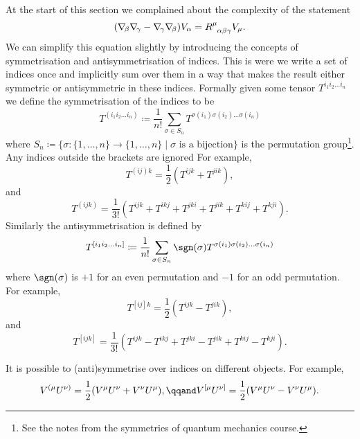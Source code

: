 At the start of this section we complained about the complexity of the statement
\begin{equation}
    (\covariantDerivative{\beta}\covariantDerivative{\gamma} - \covariantDerivative{\gamma}\covariantDerivative{\beta})V_\alpha = \tensor{R}{^\mu_{\alpha\beta\gamma}}V_\mu.
\end{equation}
We can simplify this equation slightly by introducing the concepts of symmetrisation and antisymmetrisation of indices.
This is were we write a set of indices once and implicitly sum over them in a way that makes the result either symmetric or antisymmetric in these indices.
Formally given some tensor \(T^{i_1i_2\dotso i_n}\) we define the symmetrisation of the indices to be
\begin{equation}
    T^{(i_1i_2\dotso i_n)} \coloneqq \frac{1}{n!}\sum_{\sigma \in S_n} T^{\sigma(i_1)\sigma(i_2) \dotso \sigma(i_n)}
\end{equation}
where \(S_n \coloneqq \{\sigma \colon \{1, \dotsc, n\} \to \{1, \dotsc, n\} \mid \sigma \text{ is a bijection}\}\) is the permutation group\footnote{See the notes from the symmetries of quantum mechanics course.}.
Any indices outside the brackets are ignored
For example,
\begin{equation}
    T^{(ij)k} = \frac{1}{2}(T^{ijk} + T^{jik}),
\end{equation}
and
\begin{equation}
    T^{(ijk)} = \frac{1}{3!} (T^{ijk} + T^{ikj} + T^{jki} + T^{jik} + T^{kij} + T^{kji}).
\end{equation}
Similarly the antisymmetrisation is defined by
\begin{equation}
    T^{[i_1i_2\dotso i_n]} \coloneqq \frac{1}{n!}\sum_{\sigma \in S_n} \sgn(\sigma) T^{\sigma(i_1)\sigma(i_2)\dotso \sigma(i_n)}
\end{equation}
where \(\sgn(\sigma)\) is \(+1\) for an even permutation and \(-1\) for an odd permutation.
For example,
\begin{equation}
    T^{[ij]k} = \frac{1}{2}(T^{ijk} - T^{jik}),
\end{equation}
and
\begin{equation}
    T^{[ijk]} = \frac{1}{3!}(T^{ijk} - T^{ikj} + T^{jki} - T^{jik} + T^{kij} - T^{kji}).
\end{equation}

It is possible to (anti)symmetrise over indices on different objects.
For example,
\begin{equation}
    V^{(\mu}U^{\nu)} = \frac{1}{2}(V^\mu U^\nu + V^\nu U^\mu), \qqand V^{[\mu}U^{\nu]} = \frac{1}{2}(V^\mu U^\nu - V^\nu U^\mu).
\end{equation}

